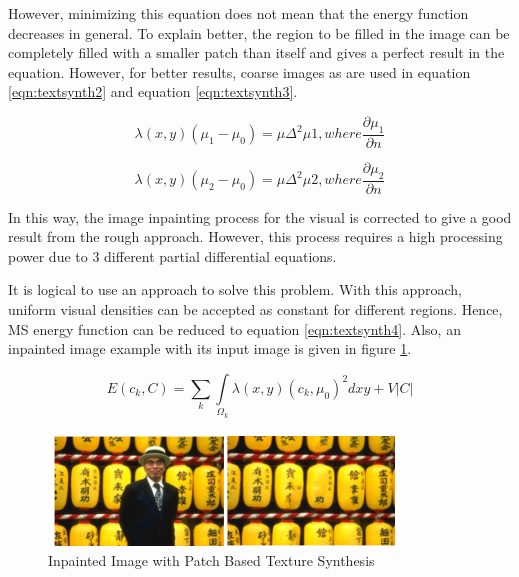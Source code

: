 However, minimizing this equation does not mean that the energy function decreases in general. To explain better, the region to be filled in the image can be completely filled with a smaller patch than itself and gives a perfect result in the equation. However, for better results, coarse images as  are used in equation \ref{eqn:textsynth2} and equation \ref{eqn:textsynth3}.

\begin{equation}
    \label{eqn:textsynth2}
    \lambda(x,y)(\mu_1-\mu_0)=\mu\Delta^2\mu1, where \frac{\partial\mu_1}{\partial n}
\end{equation}

\begin{equation}
    \label{eqn:textsynth3}
    \lambda(x,y)(\mu_2-\mu_0)=\mu\Delta^2\mu2, where \frac{\partial\mu_2}{\partial n}
\end{equation}

In this way, the image inpainting process for the visual is corrected to give a good result from the rough approach. However, this process requires a high processing power due to 3 different partial differential equations.

It is logical to use an approach to solve this problem. With this approach, uniform visual densities can be accepted as constant for different regions. Hence, MS energy function can be reduced to equation \ref{eqn:textsynth4}. Also, an inpainted image example with its input image is given in figure \ref{fig:patch-based-example}.

\begin{equation}
    \label{eqn:textsynth4}
    E(c_k, C) = \sum\limits_{k}\int\limits_{\Omega_k}\lambda(x,y){(c_k,\mu_0)}^2dxy+V|C|
\end{equation}

\begin{figure}[h]
    \centering
    \includegraphics{figures/chapter2/Patch-Based-texture-synth-example.png}
    \vspace*{5mm}
    \caption{Inpainted Image with Patch Based Texture Synthesis\cite{patch_based_tex_synthesis}}
    \label{fig:patch-based-example}
\end{figure}

